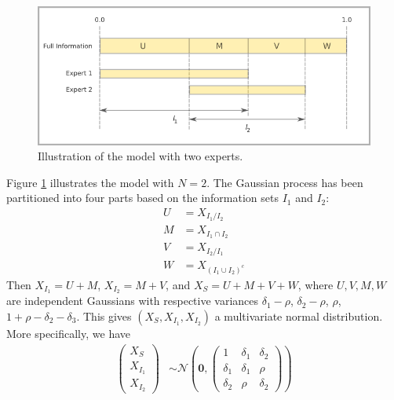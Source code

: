 \documentclass[11pt,twoside]{article}
\begin{document}
\begin{figure}[htbp]
   \includegraphics[width = \textwidth]{N=2} %
   \caption{Illustration of the model with two experts.}
   \label{diagram2}
\end{figure}

Figure \ref{diagram2} illustrates the model with $N=2$. The Gaussian process has been partitioned into four parts based on the information sets $I_1$ and $I_2$:
\begin{align*}
 U &= X_{I_1 / I_2}\\
M &= X_{I_1 \cap I_2}\\
V &= X_{I_2 / I_1}\\
W &= X_{(I_1 \cup I_2)^c}
\end{align*}
Then $X_{I_1} = U + M$, $X_{I_2} = M + V$, and $X_S = U+M+V+W$, where $U, V, M, W$ are independent Gaussians with respective variances $\delta_1-\rho$, $\delta_2-\rho$, $\rho$, $1+\rho-\delta_2 - \delta_3$. This gives $(X_{S}, X_{I_1}, X_{I_2})$ a multivariate normal distribution. More specifically, we have 
\begin{align}
\left(\begin{matrix} X_S \\ X_{I_1}\\ X_{I_2} \end{matrix}\right) &\sim \mathcal{N}\left(
 \boldsymbol{0},  \left(\begin{matrix} 
1 & \delta_1 & \delta_2\\
\delta_1 & \delta_1 &\rho\\
\delta_2 & \rho & \delta_2
 \end{matrix}\right)\right) \label{twoExperts}
\end{align}
\end{document}
